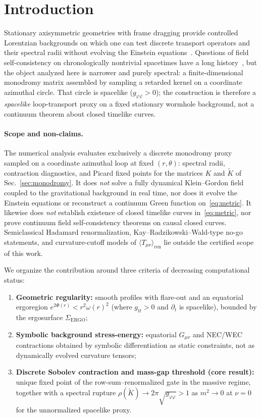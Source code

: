 \documentclass{iopjournal}
\newcommand{\Phir}{\Phi(r)}
\newcommand{\omegar}{\omega(r)}
\newcommand{\Gmn}{G_{\mu\nu}}
\newcommand{\Tmn}{T_{\mu\nu}}
\theoremstyle{remark}
\begin{document}
\section{Introduction}
\label{sec:intro}

Stationary axisymmetric geometries with frame dragging provide controlled Lorentzian backgrounds on which one can test discrete transport operators and their spectral radii without evolving the Einstein equations~\cite{Morris1988,Visser1995}.
Questions of field self-consistency on chronologically nontrivial spacetimes have a long history~\cite{Hawking1992,Novikov1989,Friedman1990,KimThorne1991}, but the object analyzed here is narrower and purely spectral: a finite-dimensional monodromy matrix assembled by sampling a retarded kernel on a coordinate azimuthal circle.
That circle is spacelike ($g_{\varphi\varphi}>0$); the construction is therefore a \emph{spacelike} loop-transport proxy on a fixed stationary wormhole background, not a continuum theorem about closed timelike curves.

\paragraph{Scope and non-claims.}
The numerical analysis evaluates exclusively a discrete monodromy proxy sampled on a coordinate azimuthal loop at fixed $(r,\theta)$: spectral radii, contraction diagnostics, and Picard fixed points for the matrices $K$ and $\widetilde{K}$ of Sec.~\ref{sec:monodromy}.
It does \emph{not} solve a fully dynamical Klein--Gordon field coupled to the gravitational background in real time, nor does it evolve the Einstein equations or reconstruct a continuum Green function on~\eqref{eq:metric}.
It likewise does \emph{not} establish existence of closed timelike curves in~\eqref{eq:metric}, nor prove continuum field self-consistency theorems on causal closed curves.
Semiclassical Hadamard renormalization, Kay--Radzikowski--Wald-type no-go statements, and curvature-cutoff models of $\langle\Tmn\rangle_{\mathrm{ren}}$ lie outside the certified scope of this work.

We organize the contribution around three criteria of decreasing computational status:
\begin{enumerate}
  \item[(C1)] \textbf{Geometric regularity:}
    smooth profiles with flare-out and an equatorial ergoregion $e^{2\Phir}<r^{2}\omegar^{2}$ (where $g_{tt}>0$ and $\partial_{t}$ is spacelike), bounded by the ergosurface $\Sigma_{\mathrm{ERGO}}$;
  \item[(C2)] \textbf{Symbolic background stress-energy:}
    equatorial $\Gmn$ and NEC/WEC contractions obtained by symbolic differentiation as static constraints, not as dynamically evolved curvature tensors;
  \item[(C3)] \textbf{Discrete Sobolev contraction and mass-gap threshold (core result):}
    unique fixed point of the row-sum--renormalized gate in the massive regime, together with a spectral rupture $\rho(\widetilde{K})\to 2\pi\sqrt{g_{\varphi\varphi}}>1$ as $m^{2}\to 0$ at $\nu=0$ for the unnormalized spacelike proxy.
\end{enumerate}
\end{document}
